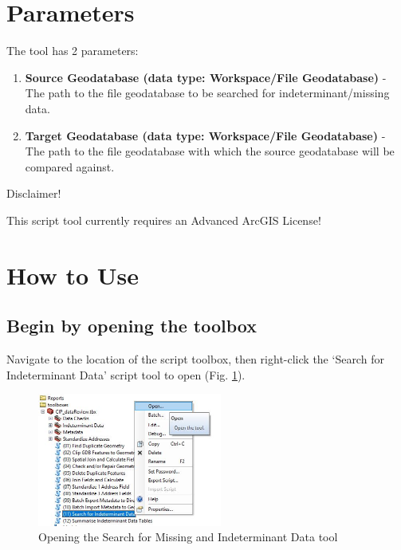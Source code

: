 \documentclass[openany]{book}
\providecommand{\tightlist}{%
  \setlength{\itemsep}{0pt}\setlength{\parskip}{0pt}}
\theoremstyle{definition}
\theoremstyle{definition}
\theoremstyle{definition}
\theoremstyle{remark}
\let\BeginKnitrBlock\begin \let\EndKnitrBlock\end
\begin{document}
\section{Parameters}\label{parameters-8}

The tool has 2 parameters:

\begin{enumerate}
\def\labelenumi{\arabic{enumi}.}
\tightlist
\item
  \textbf{Source Geodatabase (data type: Workspace/File Geodatabase)} -
  The path to the file geodatabase to be searched for
  indeterminant/missing data.
\item
  \textbf{Target Geodatabase (data type: Workspace/File Geodatabase)} -
  The path to the file geodatabase with which the source geodatabase
  will be compared against.
\end{enumerate}

\BeginKnitrBlock{warnh1}
Disclaimer!
\EndKnitrBlock{warnh1} \BeginKnitrBlock{warnp}

This script tool currently requires an Advanced ArcGIS License!
\EndKnitrBlock{warnp}

\section{How to Use}\label{how-to-use-8}

\subsection{Begin by opening the
toolbox}\label{begin-by-opening-the-toolbox-8}

Navigate to the location of the script toolbox, then right-click the
`Search for Indeterminant Data' script tool to open (Fig.
\ref{fig:indtSearchopen}).

\begin{figure}[H]

{\centering \includegraphics[width=2.39in,]{figures/indtSearch-open} 

}

\caption{Opening the Search for Missing and Indeterminant Data tool}\label{fig:indtSearchopen}
\end{figure}
\end{document}
